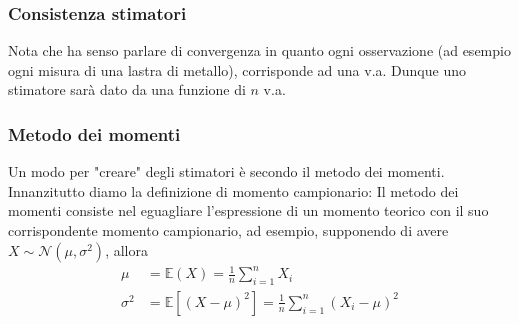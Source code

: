 \subsubsection*{Consistenza stimatori}
Nota che ha senso parlare di convergenza in quanto ogni osservazione (ad esempio ogni misura di una lastra di metallo), corrisponde ad una v.a. Dunque uno stimatore sarà dato da una funzione di $ n $ v.a.
\subsubsection*{Metodo dei momenti}
Un modo per "creare" degli stimatori è secondo il metodo dei momenti. Innanzitutto diamo la definizione di momento campionario:
Il metodo dei momenti consiste nel eguagliare l'espressione di un momento teorico con il suo corrispondente momento campionario, ad esempio, supponendo di avere $ X \sim \mathcal{N}\left(\mu , \sigma ^2 \right) $, allora
\begin{align*}
	\mu       & = \mathbb{E} \left(X\right) = \frac{1}{n} \sum_{i = 1}^{n} X_{i}                                            \\
	\sigma ^2 & = \mathbb{E} \left[\left(X - \mu \right)^2  \right]  = \frac{1}{n} \sum_{i=1}^{n} \left(X_i - \mu \right)^2
\end{align*}
